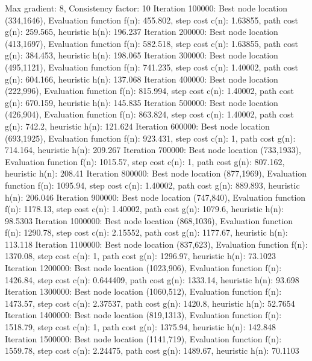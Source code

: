 \begin{DoxyCode}
Max gradient: 8, Consistency factor: 10
Iteration 100000: Best node location (334,1646), 
     Evaluation function f(n): 455.802, step cost c(n): 1.63855, path cost g(n): 259.565, heuristic h(n):
       196.237
Iteration 200000: Best node location (413,1697), 
     Evaluation function f(n): 582.518, step cost c(n): 1.63855, path cost g(n): 384.453, heuristic h(n):
       198.065
Iteration 300000: Best node location (495,1121), 
     Evaluation function f(n): 741.235, step cost c(n): 1.40002, path cost g(n): 604.166, heuristic h(n):
       137.068
Iteration 400000: Best node location (222,996), 
     Evaluation function f(n): 815.994, step cost c(n): 1.40002, path cost g(n): 670.159, heuristic h(n):
       145.835
Iteration 500000: Best node location (426,904), 
     Evaluation function f(n): 863.824, step cost c(n): 1.40002, path cost g(n): 742.2, heuristic h(n):
       121.624
Iteration 600000: Best node location (693,1925), 
     Evaluation function f(n): 923.431, step cost c(n): 1, path cost g(n): 714.164, heuristic h(n): 209.267
Iteration 700000: Best node location (733,1933), 
     Evaluation function f(n): 1015.57, step cost c(n): 1, path cost g(n): 807.162, heuristic h(n): 208.41
Iteration 800000: Best node location (877,1969), 
     Evaluation function f(n): 1095.94, step cost c(n): 1.40002, path cost g(n): 889.893, heuristic h(n):
       206.046
Iteration 900000: Best node location (747,840), 
     Evaluation function f(n): 1178.13, step cost c(n): 1.40002, path cost g(n): 1079.6, heuristic h(n):
       98.5303
Iteration 1000000: Best node location (868,1036), 
     Evaluation function f(n): 1290.78, step cost c(n): 2.15552, path cost g(n): 1177.67, heuristic h(n):
       113.118
Iteration 1100000: Best node location (837,623), 
     Evaluation function f(n): 1370.08, step cost c(n): 1, path cost g(n): 1296.97, heuristic h(n): 73.1023
Iteration 1200000: Best node location (1023,906), 
     Evaluation function f(n): 1426.84, step cost c(n): 0.644409, path cost g(n): 1333.14, heuristic h(n):
       93.698
Iteration 1300000: Best node location (1060,512), 
     Evaluation function f(n): 1473.57, step cost c(n): 2.37537, path cost g(n): 1420.8, heuristic h(n):
       52.7654
Iteration 1400000: Best node location (819,1313), 
     Evaluation function f(n): 1518.79, step cost c(n): 1, path cost g(n): 1375.94, heuristic h(n): 142.848
Iteration 1500000: Best node location (1141,719), 
     Evaluation function f(n): 1559.78, step cost c(n): 2.24475, path cost g(n): 1489.67, heuristic h(n):
       70.1103

\end{DoxyCode}
